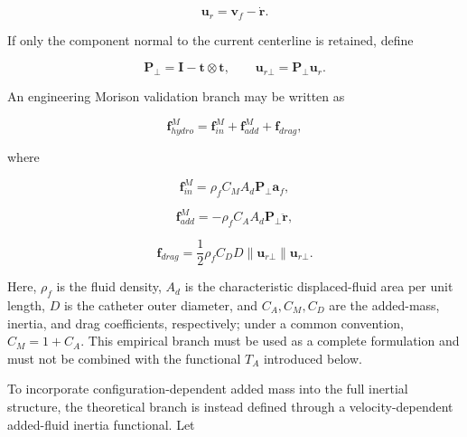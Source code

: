 \begin{equation}
\label{eq:rod-1-50}
\mathbf{u}_{r} = \mathbf{v}_{f} - \dot{\mathbf{r}}.
\end{equation}

If only the component normal to the current centerline is retained, define

\begin{equation}
\label{eq:rod-1-51}
\mathbf{P}_{\bot} = \mathbf{I} - \mathbf{t} \otimes \mathbf{t},\quad\quad\mathbf{u}_{r\bot} = \mathbf{P}_{\bot}\mathbf{u}_{r}.
\end{equation}

An engineering Morison validation branch may be written as\cite{Morison1950,Newman1977MarineHydrodynamics,Faltinsen1990SeaLoads}

\begin{equation}
\label{eq:rod-1-52}
\mathbf{f}_{hydro}^{M} = \mathbf{f}_{in}^{M} + \mathbf{f}_{add}^{M} + \mathbf{f}_{drag},
\end{equation}

where

\begin{equation}
\label{eq:rod-1-53}
\mathbf{f}_{in}^{M} = \rho_{f}C_{M}A_{d}\mathbf{P}_{\bot}\mathbf{a}_{f},
\end{equation}

\begin{equation}
\label{eq:rod-1-54}
\mathbf{f}_{add}^{M} = - \rho_{f}C_{A}A_{d}\mathbf{P}_{\bot}\ddot{\mathbf{r}},
\end{equation}

\begin{equation}
\label{eq:rod-1-55}
\mathbf{f}_{drag} = \frac{1}{2}\rho_{f}C_{D}D \parallel \mathbf{u}_{r\bot} \parallel \mathbf{u}_{r\bot}.
\end{equation}

Here, \(\rho_{f}\) is the fluid density, \(A_{d}\) is the characteristic displaced-fluid area per unit length, \(D\) is the catheter outer diameter, and \(C_{A},C_{M},C_{D}\) are the added-mass, inertia, and drag coefficients, respectively; under a common convention, \(C_{M} = 1 + C_{A}\). This empirical branch must be used as a complete formulation and must not be combined with the functional \(T_{A}\) introduced below.

To incorporate configuration-dependent added mass into the full inertial structure, the theoretical branch is instead defined through a velocity-dependent added-fluid inertia functional. Let\cite{Newman1977MarineHydrodynamics,Faltinsen1990SeaLoads}

